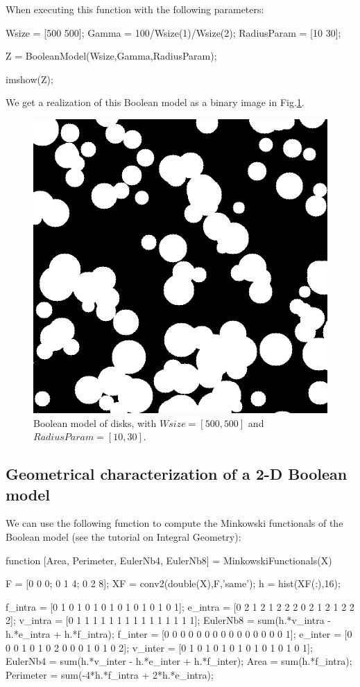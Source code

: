 When executing this function with the following parameters:
\begin{matlab}
Wsize = [500 500];
Gamma = 100/Wsize(1)/Wsize(2);
RadiusParam = [10 30]; %

Z = BooleanModel(Wsize,Gamma,RadiusParam);

imshow(Z);
\end{matlab}
We get a realization of this Boolean model as a binary image in Fig.\ref{fig:boolean_models:matlab:bmdisks}.
\begin{figure}[h]
\centering
\includegraphics[width=.5\linewidth]{BMdisks}
\caption{Boolean model of disks, with $Wsize=[500,500]$ and $RadiusParam=[10,30]$.}
\label{fig:boolean_models:matlab:bmdisks}
\end{figure}


\subsection{Geometrical characterization of a 2-D Boolean model}
We can use the following function to compute the Minkowski functionals of the Boolean model (see the tutorial on Integral Geometry):
\begin{matlab}
function [Area, Perimeter, EulerNb4, EulerNb8] = MinkowskiFunctionals(X)

F = [0 0 0; 0 1 4; 0 2 8];
XF = conv2(double(X),F,'same');
h = hist(XF(:),16);

f_intra = [0 1 0 1 0 1 0 1 0 1 0 1 0 1 0 1];
e_intra = [0 2 1 2 1 2 2 2 0 2 1 2 1 2 2 2];
v_intra = [0 1 1 1 1 1 1 1 1 1 1 1 1 1 1 1];
EulerNb8 = sum(h.*v_intra - h.*e_intra + h.*f_intra);
f_inter = [0 0 0 0 0 0 0 0 0 0 0 0 0 0 0 1];
e_inter = [0 0 0 1 0 1 0 2 0 0 0 1 0 1 0 2];
v_inter = [0 1 0 1 0 1 0 1 0 1 0 1 0 1 0 1];
EulerNb4 = sum(h.*v_inter - h.*e_inter + h.*f_inter);
Area = sum(h.*f_intra);
Perimeter = sum(-4*h.*f_intra + 2*h.*e_intra);
\end{matlab}

